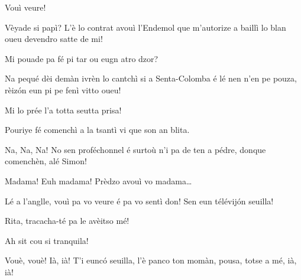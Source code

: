 \begin{drama}
\Ritaspeaks Vouì veure!

\Eumprezeospeaks  Vèyade si papì? L’è lo contrat avouì l’Endemol que m’autorize a baillì lo blan oueu devendro satte de mi!

\Ritaspeaks Mi pouade pa fé pi tar ou eugn atro dzor?

\Eumprezeospeaks Na pequé dèi demàn ivrèn lo cantchì si a Senta-Colomba é lé nen n’en pe pouza, rèizón eun pi pe fenì vitto oueu!

\Ritaspeaks Mi lo prée l'a totta seutta prisa! 

\Pascalspeaks Pouriye fé comenchì a la tsantì vi que son an blita.

\Eumprezeospeaks Na, Na, Na! No sen proféchonnel é surtoù n’i pa de ten a pédre, donque comenchèn, alé Simon!


\Ritaspeaks Madama! Euh madama! Prèdzo avouì vo madama\ldots


\Ritaspeaks Lé a l'anglle, vouì pa vo veure é pa vo sentì don! Sen eun télévij\'on seuilla!

\Pascalspeaks Rita, tracacha-té pa le avèitso mé!

\Ritaspeaks {} Ah sit cou si tranquila!


\Ritaspeaks Vouè, vouè!  Ià, ià! T’i eunc\'o seuilla, l’è panco ton momàn, pousa, totse a mé, ià, ià!







\end{drama}
